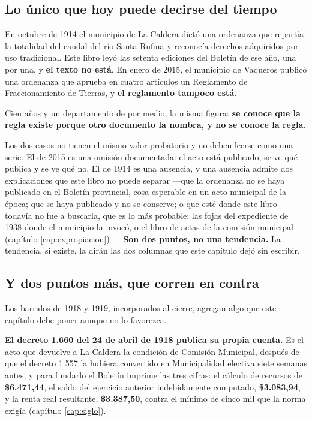 \subsection*{Lo único que hoy puede decirse del tiempo}

En octubre de 1914 el municipio de La Caldera dictó una ordenanza que repartía la totalidad del
caudal del río Santa Rufina y reconocía derechos adquiridos por uso tradicional. Este libro
leyó las setenta ediciones del Boletín de ese año, una por una, y \textbf{el texto no
está}. En enero de 2015, el municipio de Vaqueros publicó una ordenanza que aprueba en cuatro
artículos un Reglamento de Fraccionamiento de Tierras, y \textbf{el reglamento tampoco está}.

Cien años y un departamento de por medio, la misma figura: \textbf{se conoce que la regla
existe porque otro documento la nombra, y no se conoce la regla}.

\begin{cautela}
Los dos casos no tienen el mismo valor probatorio y no deben leerse como una serie. El de 2015
es una omisión documentada: el acto está publicado, se ve qué publica y se ve qué no. El de
1914 es una ausencia, y una ausencia admite dos explicaciones que este libro no puede separar
---que la ordenanza no se haya publicado en el Boletín provincial, cosa esperable en un acto
municipal de la época; que se haya publicado y no se conserve; o que esté donde este libro
todavía no fue a buscarla, que es lo más probable: las fojas del expediente de 1938 donde el
municipio la invocó, o el libro de actas de la comisión municipal (capítulo
\ref{cap:expropiacion})---. \textbf{Son dos puntos, no una tendencia.} La tendencia, si existe, la dirán las dos columnas que este capítulo dejó sin
escribir.
\end{cautela}

\subsection*{Y dos puntos más, que corren en contra}

Los barridos de 1918 y 1919, incorporados al cierre, agregan algo que este capítulo debe poner
aunque no lo favorezca.

\textbf{El decreto 1.660 del 24 de abril de 1918 publica su propia cuenta.} Es el acto que
devuelve a La Caldera la condición de Comisión Municipal, después de que el decreto 1.557 la
hubiera convertido en Municipalidad electiva siete semanas antes, y para fundarlo el Boletín
imprime las tres cifras: el cálculo de recursos de \textbf{\$6.471,44}, el saldo del ejercicio
anterior indebidamente computado, \textbf{\$3.083,94}, y la renta real resultante,
\textbf{\$3.387,50}, contra el mínimo de cinco mil que la norma exigía (capítulo
\ref{cap:siglo}).

